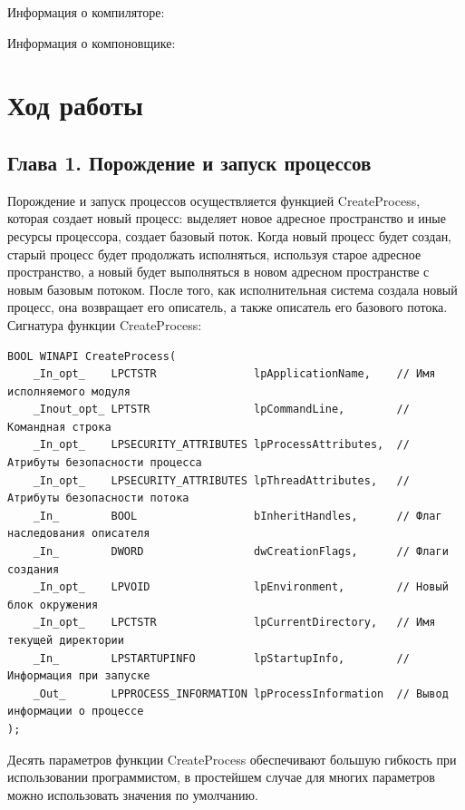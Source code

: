 \documentclass[14pt,a4paper,report]{report}
\begin{document}
Информация о компиляторе:



Информация о компоновщике:



\section{Ход работы}

\subsection{Глава 1. Порождение и запуск процессов}

Порождение и запуск процессов осуществляется функцией CreateProcess, которая создает новый процесс: выделяет новое адресное пространство и иные ресурсы процессора, создает базовый поток. Когда новый процесс будет создан, старый процесс будет продолжать исполняться, используя старое адресное пространство, а новый будет выполняться в новом адресном пространстве с новым базовым потоком. После того, как исполнительная система создала новый процесс, она возвращает его описатель, а также описатель его базового потока. Сигнатура функции CreateProcess:

\begin{verbatim}
BOOL WINAPI CreateProcess(
    _In_opt_    LPCTSTR               lpApplicationName,    // Имя исполняемого модуля
    _Inout_opt_ LPTSTR                lpCommandLine,        // Командная строка
    _In_opt_    LPSECURITY_ATTRIBUTES lpProcessAttributes,  // Атрибуты безопасности процесса
    _In_opt_    LPSECURITY_ATTRIBUTES lpThreadAttributes,   // Атрибуты безопасности потока
    _In_        BOOL                  bInheritHandles,      // Флаг наследования описателя
    _In_        DWORD                 dwCreationFlags,      // Флаги создания
    _In_opt_    LPVOID                lpEnvironment,        // Новый блок окружения
    _In_opt_    LPCTSTR               lpCurrentDirectory,   // Имя текущей директории
    _In_        LPSTARTUPINFO         lpStartupInfo,        // Информация при запуске
    _Out_       LPPROCESS_INFORMATION lpProcessInformation  // Вывод информации о процессе
);
\end{verbatim}

Десять параметров функции CreateProcess обеспечивают большую гибкость при использовании программистом, в простейшем случае для многих параметров можно использовать значения по умолчанию.
\end{document}
